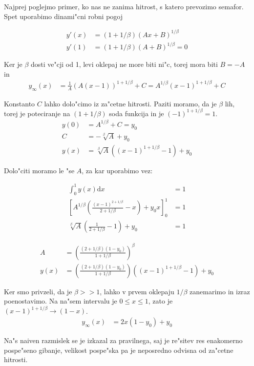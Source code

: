 \documentclass[12pt]{article}
\newcommand{\dd}{\mathrm{d}}
\begin{document}
Najprej poglejmo primer, ko nas ne zanima hitrost, s katero prevozimo semafor. Spet uporabimo dinami"cni robni pogoj

\begin{align}
  y'(x) &= (1+1/\beta) (Ax+B)^{1/\beta} \\
  y'(1) &= (1+1/\beta) (A+B)^{1/\beta} = 0 
\end{align}

Ker je $\beta$ dosti ve"cji od 1, levi oklepaj ne more biti ni"c, torej mora biti $B=-A$ in
\begin{align}
  y_\infty(x) &= \frac{1}{A}\left(A(x-1)\right)^{1+1/\beta} + C = A^{1/\beta} (x-1)^{1+1/\beta} + C
\end{align}

Konstanto $C$ lahko dolo"cimo iz za"cetne hitrosti. Paziti moramo, da je $\beta$ lih, torej je poteciranje na $(1+1/\beta)$ soda funkcija in je $(-1)^{1+1/\beta} = 1$.
\begin{align}
  y(0) &= A^{1/\beta} + C = y_0 \\
  C &= -\sqrt[\beta]{A} + y_0 \\
  y(x) &= \sqrt[\beta]{A} ( (x-1)^{1+1/\beta} - 1 ) + y_0
\end{align}


Dolo"citi moramo le "se $A$, za kar uporabimo vez:

\begin{align}
  \int_0^1 y(x) \dd x &= 1 \\
  \left[A^{1/\beta} \left(\frac{(x-1)^{2+1/\beta}}{2+1/\beta} - x\right) + y_0 x\right]_0^1 &= 1 \\
  \sqrt[\beta]{A}\left(\frac{1}{2+1/\beta}-1\right) + y_0 &= 1
\end{align}

\begin{align}
  A &= \left( \frac{(2+1/\beta)(1-y_0)}{1+1/\beta} \right)^\beta \\
  y(x) &= \left( \frac{(2+1/\beta)(1-y_0)}{1+1/\beta} \right) \left( (x-1)^{1+1/\beta} - 1 \right) + y_0
\end{align}

Ker smo privzeli, da je $\beta >> 1$, lahko v prvem oklepaju $1/\beta$ zanemarimo in izraz poenostavimo. Na na"sem intervalu je $0\leq x \leq 1$, zato je $(x-1)^{1+1/\beta} \to (1-x)$. 
\begin{align}
 y_\infty(x) &= 2x(1-y_0) + y_0 
\end{align}

Na"s naiven razmislek se je izkazal za pravilnega, saj je re"sitev res enakomerno pospe"seno gibanje, velikost pospe"ska pa je neposredno odvisna od za"cetne hitrosti. 
\end{document}
